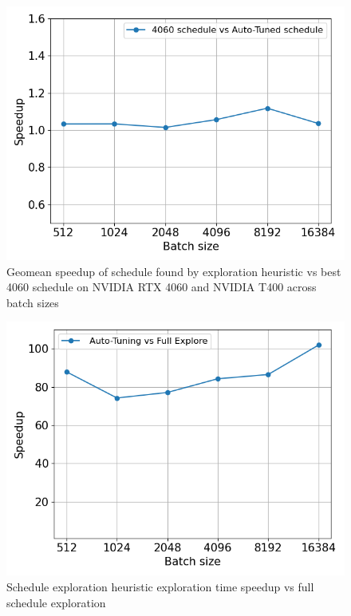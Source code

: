 \begin{figure}[htb]
  \centering
  \includegraphics[width=0.75\linewidth]{figures/geomean_speedup_T400_4060_vs_T400.png}
  \caption{Geomean speedup of schedule found by exploration heuristic vs best 4060 schedule on NVIDIA RTX 4060 and NVIDIA T400 across batch sizes}
  \label{Fig:AutotuningSpeedupvs4060Sched}
\end{figure}


\begin{figure}[htb]
  \centering
  \includegraphics[width=0.75\linewidth]{figures/geomean_speedup_4060_full_exp_vs_at.png}
  \caption{Schedule exploration heuristic exploration time speedup vs full schedule exploration}
  \label{Fig:HeuristicVsFullExplore_Speedup}
\end{figure}

